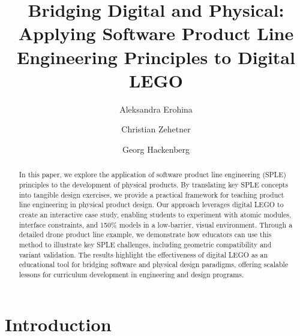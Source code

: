 \documentclass[sigconf,review]{acmart}
\begin{document}
\title{Bridging Digital and Physical: Applying Software Product Line Engineering Principles to Digital LEGO}

\author{Aleksandra Erohina}

\author{Christian Zehetner}

\author{Georg Hackenberg}

\begin{abstract}
    In this paper, we explore the application of software product line engineering (SPLE) principles to the development of physical products. 
    By translating key SPLE concepts into tangible design exercises, we provide a practical framework for teaching product line engineering in physical product design. 
    Our approach leverages digital LEGO to create an interactive case study, enabling students to experiment with atomic modules, interface constraints, and 150\% models in a low-barrier, visual environment. 
    Through a detailed drone product line example, we demonstrate how educators can use this method to illustrate key SPLE challenges, including geometric compatibility and variant validation. 
    The results highlight the effectiveness of digital LEGO as an educational tool for bridging software and physical design paradigms, offering scalable lessons for curriculum development in engineering and design programs.
\end{abstract}


\maketitle

\section{Introduction}
\label{sec:introduction}
\end{document}
